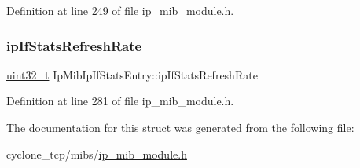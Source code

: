 Definition at line 249 of file ip\+\_\+mib\+\_\+module.\+h.

\mbox{\label{structIpMibIpIfStatsEntry_af4eda1b6748919f295a25707d189ad39}} 
\subsubsection{\texorpdfstring{ip\+If\+Stats\+Refresh\+Rate}{ipIfStatsRefreshRate}}
{\footnotesize\ttfamily \hyperlink{stdint_8h_a435d1572bf3f880d55459d9805097f62}{uint32\+\_\+t} Ip\+Mib\+Ip\+If\+Stats\+Entry\+::ip\+If\+Stats\+Refresh\+Rate}



Definition at line 281 of file ip\+\_\+mib\+\_\+module.\+h.



The documentation for this struct was generated from the following file\+:\begin{DoxyCompactItemize}
\item 
cyclone\+\_\+tcp/mibs/\hyperlink{ip__mib__module_8h}{ip\+\_\+mib\+\_\+module.\+h}\end{DoxyCompactItemize}
